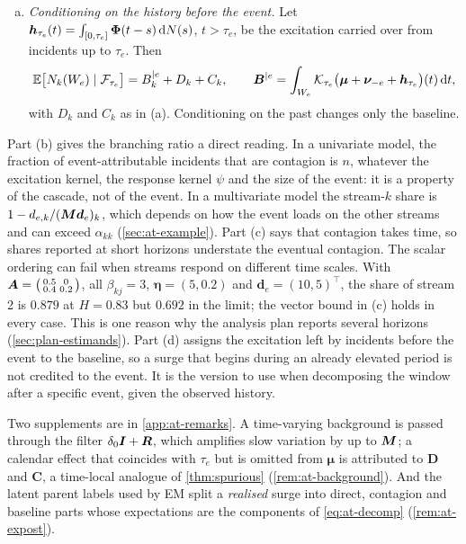 \begin{theorem}
\begin{enumerate}[(a)]
  \item \emph{Conditioning on the history before the event.} Let
  $\bm h_{\tau_e}(t)=\int_{[0,\tau_e]}\bm{\Phi}(t-s)\,\mathrm{d}N(s)$, $t>\tau_e$, be the
  excitation carried over from incidents up to $\tau_e$. Then
  \begin{equation}\label{eq:at-cond}
    \mathbb{E}\bigl[N_k(W_e)\mid\mathcal{F}_{\tau_e}\bigr]=B^{\mid e}_k+D_k+C_k,\qquad
    \bm B^{\mid e}=\int_{W_e}\mathcal K_{\tau_e}\bigl(\bm\mu+\bm\nu_{-e}+\bm h_{\tau_e}\bigr)(t)\,\mathrm{d} t ,
  \end{equation}
  with $D_k$ and $C_k$ as in (a). Conditioning on the past changes only the baseline.
\end{enumerate}
\end{theorem}

Part (b) gives the branching ratio a direct reading. In a univariate model, the
fraction of event-attributable incidents that are contagion is $n$, whatever the
excitation kernel, the response kernel $\psi$ and the size of the event: it is a property
of the cascade, not of the event. In a multivariate model the stream-$k$ share is
$1-d_{e,k}/(\bm{M}\bm d_e)_k$, which depends on how the event loads on the other streams
and can exceed $\alpha_{kk}$ (\cref{sec:at-example}). Part (c) says that contagion takes
time, so shares reported at short horizons understate the eventual contagion. The scalar
ordering can fail when streams respond on different time scales. With
$\bm{A}=\bigl(\begin{smallmatrix}0.5&0\\0.4&0.2\end{smallmatrix}\bigr)$, all
$\beta_{kj}=3$, $\bm\eta=(5,0.2)$ and $\bm d_e=(10,5)^{\top}$, the share of stream 2 is
$0.879$ at $H=0.83$ but $0.692$ in the limit; the vector bound in (c) holds in every case.
This is one reason why the analysis plan reports several horizons
(\cref{sec:plan-estimands}). Part (d) assigns the excitation left by incidents before the
event to the baseline, so a surge that begins during an already elevated period is not
credited to the event. It is the version to use when decomposing the window after a
specific event, given the observed history.

Two supplements are in \cref{app:at-remarks}. A time-varying background is passed through
the filter $\delta_0\bm{I}+\bm{R}$, which amplifies slow variation by up to $\bm{M}$; a calendar
effect that coincides with $\tau_e$ but is omitted from $\bm\mu$ is attributed to $\bm D$
and $\bm C$, a time-local analogue of \cref{thm:spurious} (\cref{rem:at-background}). And the
latent parent labels used by EM split a \emph{realised} surge into direct, contagion and
baseline parts whose expectations are the components of \eqref{eq:at-decomp}
(\cref{rem:at-expost}).

